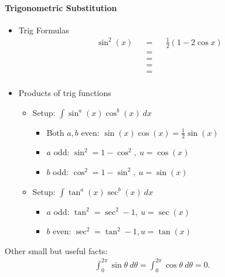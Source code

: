 \hypertarget{trigonometric-substitution}{%
\paragraph{Trigonometric
Substitution}\label{trigonometric-substitution}}


\begin{itemize}
\item
  Trig Formulas
  \begin{align*}
  \sin^2(x) && = && \frac{1}{2}(1-2\cos x) \\
  && = && \\
  && = && \\
  && = && \\
  && = && \\
  \end{align*} 
\item
  Products of trig functions

  \begin{itemize}
  \tightlist
  \item
    Setup: \(\int \sin^a(x) \cos^b(x) ~dx\)

    \begin{itemize}
    \tightlist
    \item
      Both \(a,b\) even: \(\sin(x)\cos(x) = \frac{1}{2} \sin(x)\)
    \item
      \(a\) odd: \(\sin^2 = 1-\cos^2,~u=\cos(x)\)
    \item
      \(b\) odd: \(\cos^2 = 1-\sin^2,~u=\sin(x)\)
    \end{itemize}
  \item
    Setup: \(\int \tan^a(x) \sec^b(x) ~dx\)

    \begin{itemize}
    \tightlist
    \item
      \(a\) odd: \(\tan^2 = \sec^2 - 1,~ u = \sec(x)\)
    \item
      \(b\) even: \(\sec^2 = \tan^2 - 1, u = \tan(x)\)
    \end{itemize}
  \end{itemize}
\end{itemize}

Other small but useful facts:
\begin{align*}  
\int_0^{2\pi} \sin \theta~d\theta = \int_0^{2\pi} \cos \theta~d\theta = 0
.\end{align*}

